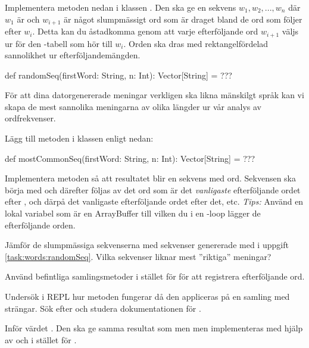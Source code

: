 Implementera metoden  nedan i klassen . Den ska ge en sekvens $w_{1}, w_{2}, ..., w_{n}$  där $w_{1}$ är  och $w_{i+1}$ är något slumpmässigt ord som är draget bland de ord som följer efter $w_{i}$. Detta kan du åstadkomma genom att varje efterföljande ord $w_{i+1}$ väljs ur  för den -tabell som hör till $w_{i}$. Orden ska dras med rektangelfördelad sannolikhet ur efterföljandemängden.
\begin{Code}
def randomSeq(firstWord: String, n: Int): Vector[String] = ???
\end{Code}

\Task \label{task:words:mostCommonSeq} För att dina datorgenererade meningar verkligen ska likna mänskilgt språk kan vi skapa de mest sannolika meningarna av olika längder ur vår analys av ordfrekvenser.

Lägg till metoden  i klassen  enligt nedan:
\begin{Code}
def mostCommonSeq(firstWord: String, n: Int): Vector[String] = ???
\end{Code}
\Subtask Implementera metoden så att resultatet blir en sekvens med  ord. Sekvensen ska börja med  och därefter följas av det ord som är det \emph{vanligaste} efterföljande ordet efter , och därpå det vanligaste efterföljande ordet efter det, etc. \emph{Tips:} Använd en lokal variabel  som är en ArrayBuffer till vilken du i en -loop lägger de efterföljande orden.

\Subtask Jämför de slumpmässiga sekvenserna med sekvenser genererade med  i uppgift \ref{task:words:randomSeq}. Vilka sekvenser liknar mest ''riktiga'' meningar?


\Task Använd befintliga samlingsmetoder i stället för  för att registrera efterföljande ord.

\Subtask Undersök i REPL hur metoden  fungerar då den appliceras på en samling med strängar. Sök efter och studera dokumentationen för .

\Subtask Inför värdet . Den ska ge samma resultat som  men men implementeras med hjälp av  och  i stället för .

